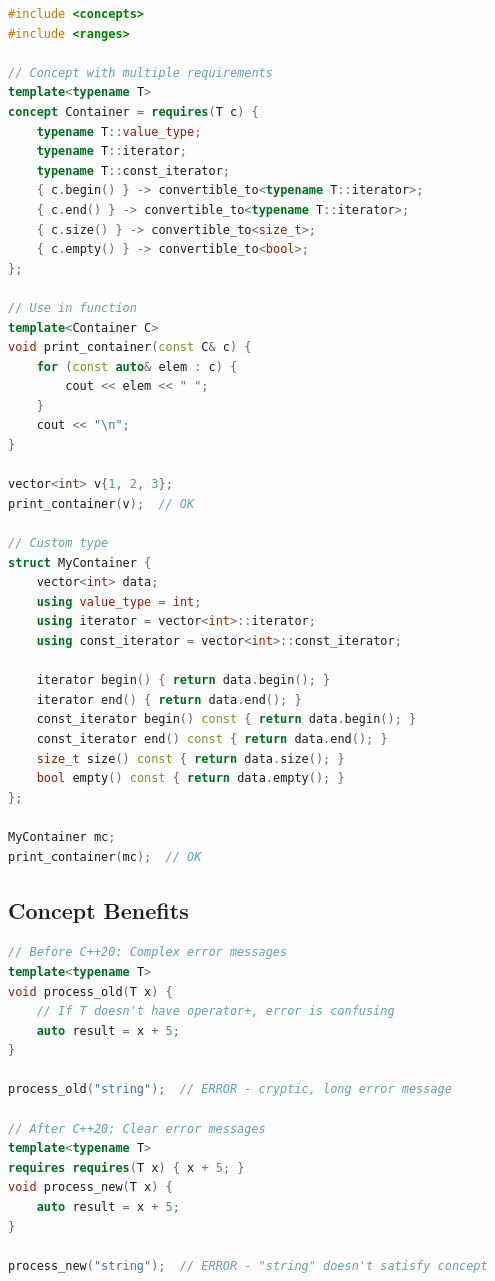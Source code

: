 \begin{lstlisting}[language={C++}]
#include <concepts>
#include <ranges>

// Concept with multiple requirements
template<typename T>
concept Container = requires(T c) {
    typename T::value_type;
    typename T::iterator;
    typename T::const_iterator;
    { c.begin() } -> convertible_to<typename T::iterator>;
    { c.end() } -> convertible_to<typename T::iterator>;
    { c.size() } -> convertible_to<size_t>;
    { c.empty() } -> convertible_to<bool>;
};

// Use in function
template<Container C>
void print_container(const C& c) {
    for (const auto& elem : c) {
        cout << elem << " ";
    }
    cout << "\n";
}

vector<int> v{1, 2, 3};
print_container(v);  // OK

// Custom type
struct MyContainer {
    vector<int> data;
    using value_type = int;
    using iterator = vector<int>::iterator;
    using const_iterator = vector<int>::const_iterator;
    
    iterator begin() { return data.begin(); }
    iterator end() { return data.end(); }
    const_iterator begin() const { return data.begin(); }
    const_iterator end() const { return data.end(); }
    size_t size() const { return data.size(); }
    bool empty() const { return data.empty(); }
};

MyContainer mc;
print_container(mc);  // OK
\end{lstlisting}

\hypertarget{concept-benefits}{%
\subsection{Concept Benefits}\label{concept-benefits}}

\begin{lstlisting}[language={C++}]
// Before C++20: Complex error messages
template<typename T>
void process_old(T x) {
    // If T doesn't have operator+, error is confusing
    auto result = x + 5;
}

process_old("string");  // ERROR - cryptic, long error message

// After C++20: Clear error messages
template<typename T>
requires requires(T x) { x + 5; }
void process_new(T x) {
    auto result = x + 5;
}

process_new("string");  // ERROR - "string" doesn't satisfy concept
\end{lstlisting}

